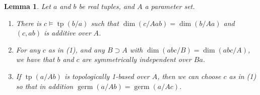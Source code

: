 \documentclass{amsart}
\newtheorem{lemma}[theorem]{Lemma}
\theoremstyle{definition}
\newcommand{\tp}{\operatorname{tp}}
\begin{document}
\begin{lemma}\label{L: additive extension}
    Let $a$ and $b$ be real tuples, and $A$ a parameter set. 
    \begin{enumerate}
        \item There is $c\models\tp(b/a)$ such that $\dim(c/Aab)=\dim(b/Aa)$ and $(c,ab)$ is additive over $A$.
        \item For any $c$ as in (1), and any $B\supset A$ with $\dim(abc/B)=\dim(abc/A)$, we have that $b$ and $c$ are symmetrically independent over $Ba$.
        \item If $\tp(a/Ab)$ is topologically 1-based over $A$, then we can choose $c$ as in (1) so that in addition $\operatorname{germ}(a/Ab)=\operatorname{germ}(a/Ac)$. 
    \end{enumerate}
\end{lemma}
\end{document}
